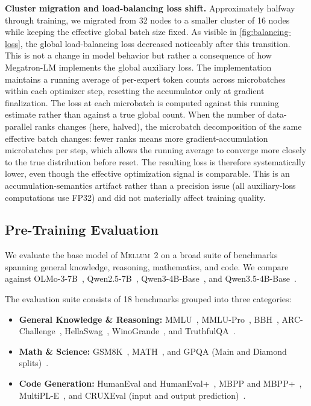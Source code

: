 \documentclass[11pt,a4paper]{article}
\newcommand{\modelname}{\textsc{Mellum~2}\xspace}
\begin{document}
\textbf{Cluster migration and load-balancing loss shift.}
Approximately halfway through training, we migrated from 32 nodes to a
smaller cluster of 16 nodes while keeping the effective global batch size
fixed. As visible in \cref{fig:balancing-loss}, the global load-balancing
loss decreased noticeably after this transition. This is not a change in
model behavior but rather a consequence of how Megatron-LM implements the
global auxiliary loss. The implementation maintains a running average of
per-expert token counts across microbatches within each optimizer step,
resetting the accumulator only at gradient finalization. The loss at each
microbatch is computed against this running estimate rather than against a
true global count. When the number of data-parallel ranks changes (here,
halved), the microbatch decomposition of the same effective batch changes:
fewer ranks means more gradient-accumulation microbatches per step, which
allows the running average to converge more closely to the true distribution
before reset. The resulting loss is therefore systematically lower, even
though the effective optimization signal is comparable. This is an
accumulation-semantics artifact rather than a precision issue (all
auxiliary-loss computations use FP32) and did not materially affect
training quality.

\subsection{Pre-Training Evaluation}
\label{sec:pretrain-eval}

We evaluate the base model of \modelname on a broad suite of benchmarks
spanning general knowledge, reasoning, mathematics, and code. We compare against OLMo-3-7B~\cite{olmo3},
Qwen2.5-7B~\cite{qwen2.5}, Qwen3-4B-Base~\cite{yang2025qwen3}, and Qwen3.5-4B-Base~\cite{qwen2026qwen35}.

The evaluation suite consists of 18 benchmarks grouped into three categories:
\begin{itemize}
  \item \textbf{General Knowledge \& Reasoning:} MMLU~\cite{hendrycks2021mmlu},
    MMLU-Pro~\cite{wang2024mmlupro}, BBH~\cite{suzgun2022bbh},
    ARC-Challenge~\cite{clark2018arc}, HellaSwag~\cite{zellers2019hellaswag},
    WinoGrande~\cite{sakaguchi2021winogrande}, and
    TruthfulQA~\cite{lin2022truthfulqa}.
  \item \textbf{Math \& Science:} GSM8K~\cite{cobbe2021gsm8k},
    MATH~\cite{hendrycks2021math}, and GPQA (Main and Diamond
    splits)~\cite{rein2023gpqa}.
  \item \textbf{Code Generation:} HumanEval and HumanEval+~\cite{chen2021humaneval,liu2023evalplus},
    MBPP and MBPP+~\cite{austin2021mbpp,liu2023evalplus},
    MultiPL-E~\cite{cassano2022multipl}, and
    CRUXEval (input and output prediction)~\cite{gu2024cruxeval}.
\end{itemize}
\end{document}
